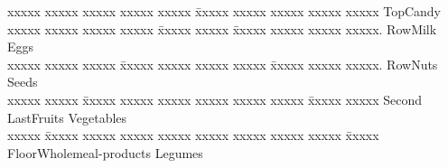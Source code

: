\begin{tabbing}

xxxxx xxxxx xxxxx xxxxx xxxxx \= xxxxx xxxxx xxxxx xxxxx xxxxx\kill
Top\>Candy\\
xxxxx xxxxx xxxxx xxxxx \= xxxxx xxxxx \= xxxxx xxxxx xxxxx xxxxx. Row\>Milk \>Eggs\\
xxxxx xxxxx xxxxx \= xxxxx xxxxx xxxxx xxxxx \= xxxxx xxxxx xxxxx. Row\>Nuts \>Seeds\\
xxxxx xxxxx \= xxxxx xxxxx xxxxx xxxxx xxxxx xxxxx \= xxxxx xxxxx\kill
Second Last\>Fruits \>Vegetables\\
xxxxx \= xxxxx xxxxx xxxxx xxxxx xxxxx xxxxx xxxxx xxxxx \= xxxxx\kill
Floor\>Wholemeal-products \>Legumes\\
\end{tabbing}


